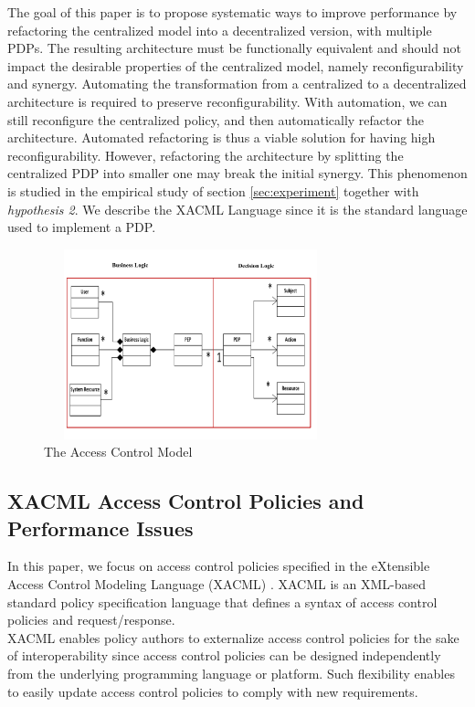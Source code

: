 The goal of this paper is to propose systematic ways to improve performance by refactoring the centralized model into a decentralized version, with multiple PDPs. The resulting
 architecture must be functionally equivalent and should not impact the desirable properties of the centralized model, namely reconfigurability and synergy.
Automating the transformation from a centralized to a decentralized architecture is required to preserve reconfigurability. With automation, we can still reconfigure the centralized policy, 
and then automatically refactor the architecture. Automated refactoring is thus a viable solution for having high reconfigurability.  
However, refactoring the architecture by splitting the centralized PDP into smaller one may break the initial synergy. This phenomenon is studied in the empirical study of section 
\ref{sec:experiment} together with \textit{hypothesis 2}. 
We describe the XACML Language since it is the standard language used to implement a PDP.


\begin{figure}[!h]
\begin{center}
\includegraphics[height=5.5cm,width=8.5cm]{model}
\caption{The Access Control Model}
\label{model}
\end{center}
\end{figure}

\subsection{XACML Access Control Policies and Performance Issues}

In this paper, we focus on access control policies specified in the eXtensible Access Control Modeling Language (XACML) \cite{sunxacml}.
XACML is an XML-based standard policy specification language that defines a syntax of access control policies and
request/response. \\XACML enables policy authors to externalize access control policies for the sake of interoperability since access control policies can be designed 
independently from the underlying programming language or platform. Such flexibility enables to easily update access control policies to comply with new requirements.

